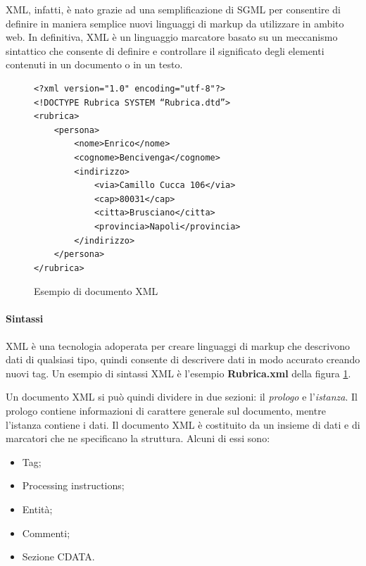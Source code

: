 XML, infatti, è nato grazie ad una semplificazione di SGML per consentire di definire in maniera semplice nuovi linguaggi di markup da utilizzare in ambito web.
In definitiva, XML è un linguaggio marcatore basato su un meccanismo sintattico che consente di definire e controllare il significato degli elementi contenuti in un documento o in un testo.

\begin{figure}
\begin{center}
\lstset{language=MYXML}
\begin{lstlisting}
<?xml version="1.0" encoding="utf-8"?>
<!DOCTYPE Rubrica SYSTEM “Rubrica.dtd”>
<rubrica>
	<persona>
		<nome>Enrico</nome>
		<cognome>Bencivenga</cognome>
		<indirizzo>
			<via>Camillo Cucca 106</via>
			<cap>80031</cap>
			<citta>Brusciano</citta>
			<provincia>Napoli</provincia>
		</indirizzo>
	</persona>
</rubrica>

\end{lstlisting}
\caption{Esempio di documento XML\label{xmlimage}}
\end{center}
\end{figure}


\paragraph{Sintassi}
XML è una tecnologia adoperata per creare linguaggi di markup che descrivono dati di qualsiasi tipo, quindi consente di descrivere dati in modo accurato creando nuovi tag.
Un esempio di sintassi XML è l'esempio \textbf{Rubrica.xml} della figura \ref{xmlimage}.


Un documento XML si può quindi dividere in due sezioni: il \textit{prologo} e l'\textit{istanza}. 
Il prologo contiene informazioni di carattere generale sul documento, mentre l'istanza contiene i dati. Il documento XML è costituito da un insieme di dati e di marcatori che ne specificano la struttura.
Alcuni di essi sono:
\begin{itemize}
\item Tag;
\item Processing instructions;
\item Entità;
\item Commenti;
\item Sezione CDATA.
\end{itemize}

